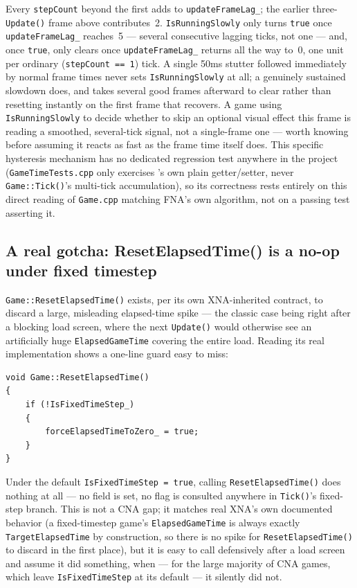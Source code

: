 Every \texttt{stepCount} beyond the first adds to \texttt{updateFrameLag\_}; the earlier
three-\texttt{Update()} frame above contributes~2. \texttt{IsRunningSlowly} only turns
\texttt{true} once \texttt{updateFrameLag\_} reaches~5 --- several consecutive lagging ticks, not
one --- and, once \texttt{true}, only clears once \texttt{updateFrameLag\_} returns all the way
to~0, one unit per ordinary (\texttt{stepCount == 1}) tick. A single 50ms stutter followed
immediately by normal frame times never sets \texttt{IsRunningSlowly} at all; a genuinely
sustained slowdown does, and takes several good frames afterward to clear rather than resetting
instantly on the first frame that recovers. A game using \texttt{IsRunningSlowly} to decide
whether to skip an optional visual effect this frame is reading a smoothed, several-tick signal,
not a single-frame one --- worth knowing before assuming it reacts as fast as the frame time
itself does. This specific hysteresis mechanism has no dedicated regression test anywhere in the
project (\texttt{GameTimeTests.cpp} only exercises 's own plain
getter/setter, never \texttt{Game::Tick()}'s multi-tick accumulation), so its correctness rests
entirely on this direct reading of \texttt{Game.cpp} matching FNA's own algorithm, not on a
passing test asserting it.

\subsection{A real gotcha: ResetElapsedTime() is a no-op under fixed timestep}

\texttt{Game::ResetElapsedTime()} exists, per its own XNA-inherited contract, to discard a
large, misleading elapsed-time spike --- the classic case being right after a blocking load
screen, where the next \texttt{Update()} would otherwise see an artificially huge
\texttt{ElapsedGameTime} covering the entire load. Reading its real implementation shows a
one-line guard easy to miss:

\begin{lstlisting}
void Game::ResetElapsedTime()
{
    if (!IsFixedTimeStep_)
    {
        forceElapsedTimeToZero_ = true;
    }
}
\end{lstlisting}

Under the default \texttt{IsFixedTimeStep = true}, calling \texttt{ResetElapsedTime()} does
nothing at all --- no field is set, no flag is consulted anywhere in \texttt{Tick()}'s
fixed-step branch. This is not a CNA gap; it matches real XNA's own documented behavior (a
fixed-timestep game's \texttt{ElapsedGameTime} is always exactly \texttt{TargetElapsedTime} by
construction, so there is no spike for \texttt{ResetElapsedTime()} to discard in the first
place), but it is easy to call defensively after a load screen and assume it did something,
when --- for the large majority of CNA games, which leave \texttt{IsFixedTimeStep} at its
default --- it silently did not.

